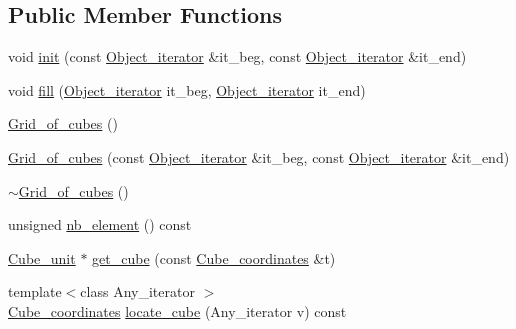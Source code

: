 \subsection*{Public Member Functions}
\begin{DoxyCompactItemize}
\item 
void \hyperlink{structESBTL_1_1Grid__of__cubes_a64ac9192d8b9e8982a5eaa05a5755ce0}{init} (const \hyperlink{structESBTL_1_1Grid__of__cubes_ae77665f05d6c7ae05c3d2d764df99193}{Object\+\_\+iterator} \&it\+\_\+beg, const \hyperlink{structESBTL_1_1Grid__of__cubes_ae77665f05d6c7ae05c3d2d764df99193}{Object\+\_\+iterator} \&it\+\_\+end)
\item 
void \hyperlink{structESBTL_1_1Grid__of__cubes_a6842218abf9fc02e646270c2f55a4067}{fill} (\hyperlink{structESBTL_1_1Grid__of__cubes_ae77665f05d6c7ae05c3d2d764df99193}{Object\+\_\+iterator} it\+\_\+beg, \hyperlink{structESBTL_1_1Grid__of__cubes_ae77665f05d6c7ae05c3d2d764df99193}{Object\+\_\+iterator} it\+\_\+end)
\item 
\hyperlink{structESBTL_1_1Grid__of__cubes_af3d6b516670d62b61925dd0b4afcc99b}{Grid\+\_\+of\+\_\+cubes} ()
\item 
\hyperlink{structESBTL_1_1Grid__of__cubes_a33317f78109f4a25b351de01e0c2603f}{Grid\+\_\+of\+\_\+cubes} (const \hyperlink{structESBTL_1_1Grid__of__cubes_ae77665f05d6c7ae05c3d2d764df99193}{Object\+\_\+iterator} \&it\+\_\+beg, const \hyperlink{structESBTL_1_1Grid__of__cubes_ae77665f05d6c7ae05c3d2d764df99193}{Object\+\_\+iterator} \&it\+\_\+end)
\item 
\hyperlink{structESBTL_1_1Grid__of__cubes_a1926aefcbc2d5bca7239cc88383b0445}{$\sim$\+Grid\+\_\+of\+\_\+cubes} ()
\item 
unsigned \hyperlink{structESBTL_1_1Grid__of__cubes_ac11f4d98c90bb979290a7c3976d5bf7e}{nb\+\_\+element} () const
\item 
\hyperlink{structESBTL_1_1Grid__of__cubes_1_1Cube__unit}{Cube\+\_\+unit} $\ast$ \hyperlink{structESBTL_1_1Grid__of__cubes_a9a2e0688f74121896de5feeebc13903b}{get\+\_\+cube} (const \hyperlink{structESBTL_1_1Grid__of__cubes_ad55c84346bab961e08d95e494551d07d}{Cube\+\_\+coordinates} \&t)
\item 
{\footnotesize template$<$class Any\+\_\+iterator $>$ }\\\hyperlink{structESBTL_1_1Grid__of__cubes_ad55c84346bab961e08d95e494551d07d}{Cube\+\_\+coordinates} \hyperlink{structESBTL_1_1Grid__of__cubes_a07bed0821e5e9ff4bc5154ae9729acb1}{locate\+\_\+cube} (Any\+\_\+iterator v) const
\item 

\end{DoxyCompactItemize}

